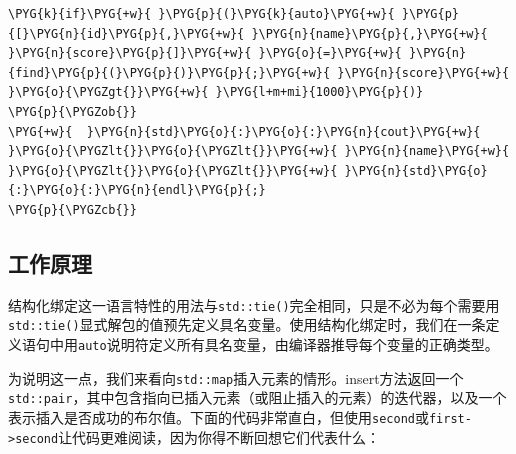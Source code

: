 \begin{codeblockbg}
\begin{Verbatim}[commandchars=\\\{\},breaklines=true,breakanywhere=true,fontsize=\codefont,xleftmargin=17bp]
\PYG{k}{if}\PYG{+w}{ }\PYG{p}{(}\PYG{k}{auto}\PYG{+w}{ }\PYG{p}{[}\PYG{n}{id}\PYG{p}{,}\PYG{+w}{ }\PYG{n}{name}\PYG{p}{,}\PYG{+w}{ }\PYG{n}{score}\PYG{p}{]}\PYG{+w}{ }\PYG{o}{=}\PYG{+w}{ }\PYG{n}{find}\PYG{p}{(}\PYG{p}{)}\PYG{p}{;}\PYG{+w}{ }\PYG{n}{score}\PYG{+w}{ }\PYG{o}{\PYGZgt{}}\PYG{+w}{ }\PYG{l+m+mi}{1000}\PYG{p}{)}
\PYG{p}{\PYGZob{}}
\PYG{+w}{  }\PYG{n}{std}\PYG{o}{:}\PYG{o}{:}\PYG{n}{cout}\PYG{+w}{ }\PYG{o}{\PYGZlt{}}\PYG{o}{\PYGZlt{}}\PYG{+w}{ }\PYG{n}{name}\PYG{+w}{ }\PYG{o}{\PYGZlt{}}\PYG{o}{\PYGZlt{}}\PYG{+w}{ }\PYG{n}{std}\PYG{o}{:}\PYG{o}{:}\PYG{n}{endl}\PYG{p}{;}
\PYG{p}{\PYGZcb{}}
\end{Verbatim}
\end{codeblockbg}



\subsection{工作原理}



结构化绑定这一语言特性的用法与\texttt{std::\allowbreak{}tie()}完全相同，只是不必为每个需要用\texttt{std::\allowbreak{}tie()}显式解包的值预先定义具名变量。使用结构化绑定时，我们在一条定义语句中用\texttt{auto}说明符定义所有具名变量，由编译器推导每个变量的正确类型。



为说明这一点，我们来看向\texttt{std::\allowbreak{}map}插入元素的情形。insert方法返回一个\texttt{std::\allowbreak{}pair}，其中包含指向已插入元素（或阻止插入的元素）的迭代器，以及一个表示插入是否成功的布尔值。下面的代码非常直白，但使用\texttt{second}或\texttt{first->\allowbreak{}second}让代码更难阅读，因为你得不断回想它们代表什么：



